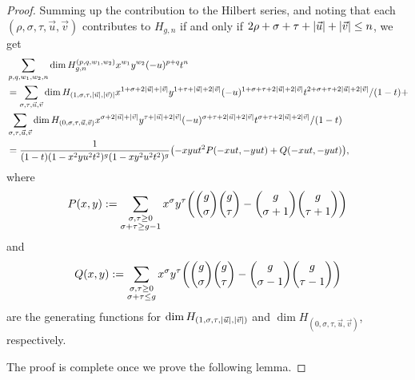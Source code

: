 \documentclass[10pt,a4paper]{amsart}
\DeclarePairedDelimiter{\abs}{\lvert}{\rvert}
\DeclarePairedDelimiter{\parens}{\lparen}{\rparen}
\begin{document}
\begin{proof}
Summing up the contribution to the Hilbert series, and noting that each $(\rho,\sigma,\tau,\vec u, \vec v)$ contributes to $H_{g,n}$ if and only if $2\rho+\sigma+\tau+\abs{\vec u}+\abs{\vec v}\leq n$, we get
\begin{align}
    &\sum_{p,q,w_1,w_2,n} \dim H_{g,n}^{(p,q,w_1,w_2)} x^{w_1}y^{w_2}(-u)^{p+q}t^n\\ 
    &= \sum_{\sigma,\tau,\vec u,\vec v} \dim H_{(1,\sigma,\tau,\abs{\vec u},\abs{\vec v)}} x^{1+\sigma+2\abs{\vec u}+\abs{\vec v}} y^{1+\tau+\abs{\vec u}+2\abs{\vec v}}(-u)^{1+\sigma+\tau+2\abs{\vec u}+2\abs{\vec v}}t^{2+\sigma+\tau+2\abs{\vec u}+2\abs{\vec v}}/(1-t)+\\
    &\sum_{\sigma,\tau,\vec u,\vec v} \dim H_{(0,\sigma,\tau,\vec u,\vec v)} x^{\sigma+2\abs{\vec u}+\abs{\vec v}} y^{\tau+\abs{\vec u}+2\abs{\vec v}}(-u)^{\sigma+\tau+2\abs{\vec u}+2\abs{\vec v}}t^{\sigma+\tau+2\abs{\vec u}+2\abs{\vec v}}/(1-t)\\
    &=\frac{1}{(1-t)(1-x^2 yu^2t^2)^g(1-xy^2u^2t^2)^g}\parens*{-xyut^2 P(-xut,-yut)+Q(-xut,-yut)},
\end{align}
where $$P(x,y):=\sum_{\substack{\sigma,\tau\geq 0\\\sigma+\tau\geq g-1}} x^\sigma y^\tau \parens*{\binom{g}{\sigma}\binom{g}{\tau}-\binom{g}{\sigma+1}\binom{g}{\tau+1}}$$ and $$Q(x,y):=\sum_{\substack{\sigma,\tau\geq 0\\\sigma+\tau\leq g}}x^\sigma y^\tau \parens*{\binom{g}{\sigma}\binom{g}{\tau}-\binom{g}{\sigma-1}\binom{g}{\tau-1}}$$
are the generating functions for $\dim H_{(1,\sigma,\tau,\abs{\vec u},\abs{\vec v})}$ and $\dim H_{(0,\sigma,\tau,\vec u,\vec v)}$, respectively.

The proof is complete once we prove the following lemma.
\end{proof}
\end{document}
